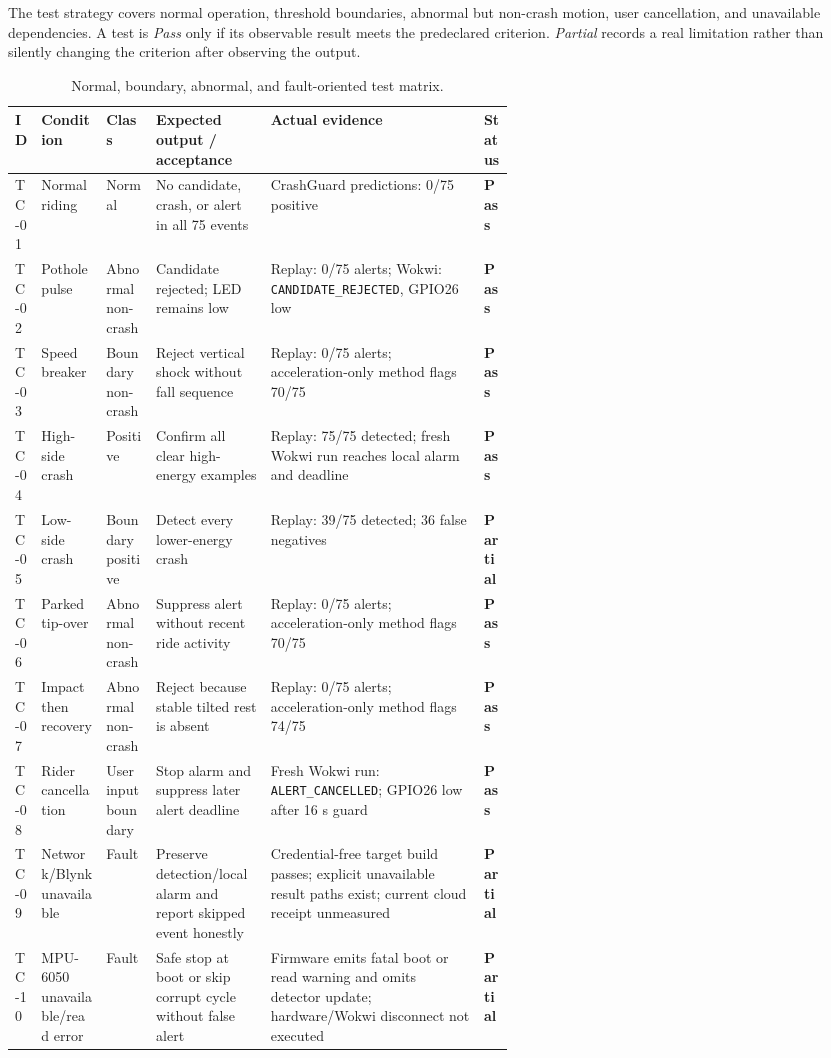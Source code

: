 \documentclass[12pt,a4paper]{article}
\newcommand{\pass}{\cellcolor{green!14}\textbf{Pass}}
\newcommand{\partialpass}{\cellcolor{orange!18}\textbf{Partial}}
\begin{document}
The test strategy covers normal operation, threshold boundaries, abnormal but
non-crash motion, user cancellation, and unavailable dependencies. A test is
\emph{Pass} only if its observable result meets the predeclared criterion.
\emph{Partial} records a real limitation rather than silently changing the
criterion after observing the output.

\begin{landscape}
\footnotesize
\setlength{\tabcolsep}{3pt}
\begin{table}[H]
\centering
\caption{Normal, boundary, abnormal, and fault-oriented test matrix.}
\label{tab:testmatrix}
\begin{tabularx}{\linewidth}{@{}p{0.055\linewidth}p{0.13\linewidth}p{0.10\linewidth}p{0.23\linewidth}X p{0.065\linewidth}@{}}
\toprule
ID & Condition & Class & Expected output / acceptance & Actual evidence & Status \\
\midrule
TC-01 & Normal riding & Normal & No candidate, crash, or alert in all 75 events & CrashGuard predictions: 0/75 positive & \pass \\
TC-02 & Pothole pulse & Abnormal non-crash & Candidate rejected; LED remains low & Replay: 0/75 alerts; Wokwi: \texttt{CANDIDATE\_REJECTED}, GPIO26 low & \pass \\
TC-03 & Speed breaker & Boundary non-crash & Reject vertical shock without fall sequence & Replay: 0/75 alerts; acceleration-only method flags 70/75 & \pass \\
TC-04 & High-side crash & Positive & Confirm all clear high-energy examples & Replay: 75/75 detected; fresh Wokwi run reaches local alarm and deadline & \pass \\
TC-05 & Low-side crash & Boundary positive & Detect every lower-energy crash & Replay: 39/75 detected; 36 false negatives & \partialpass \\
TC-06 & Parked tip-over & Abnormal non-crash & Suppress alert without recent ride activity & Replay: 0/75 alerts; acceleration-only method flags 70/75 & \pass \\
TC-07 & Impact then recovery & Abnormal non-crash & Reject because stable tilted rest is absent & Replay: 0/75 alerts; acceleration-only method flags 74/75 & \pass \\
TC-08 & Rider cancellation & User input boundary & Stop alarm and suppress later alert deadline & Fresh Wokwi run: \texttt{ALERT\_CANCELLED}; GPIO26 low after 16 s guard & \pass \\
TC-09 & Network/Blynk unavailable & Fault & Preserve detection/local alarm and report skipped event honestly & Credential-free target build passes; explicit unavailable result paths exist; current cloud receipt unmeasured & \partialpass \\
TC-10 & MPU-6050 unavailable/read error & Fault & Safe stop at boot or skip corrupt cycle without false alert & Firmware emits fatal boot or read warning and omits detector update; hardware/Wokwi disconnect not executed & \partialpass \\
\bottomrule
\end{tabularx}
\end{table}
\end{landscape}
\end{document}
